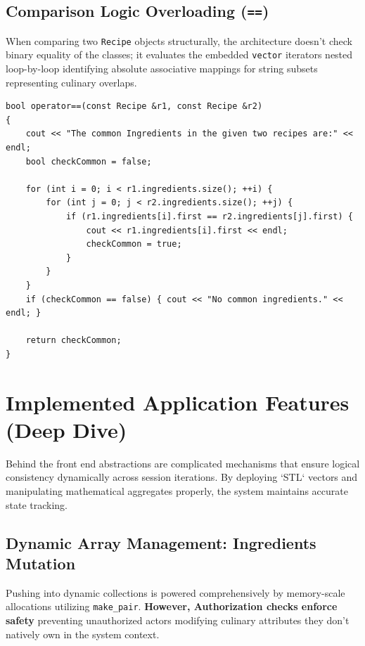 \documentclass[12pt, a4paper]{article}
\begin{document}
\subsection{Comparison Logic Overloading (\texttt{==})}
When comparing two \texttt{Recipe} objects structurally, the architecture doesn't check binary equality of the classes; it evaluates the embedded \texttt{vector} iterators nested loop-by-loop identifying absolute associative mappings for string subsets representing culinary overlaps.

\begin{lstlisting}[caption={Deep Algorithmic Association Overloading (`==`)}]
bool operator==(const Recipe &r1, const Recipe &r2)
{
    cout << "The common Ingredients in the given two recipes are:" << endl;
    bool checkCommon = false;

    for (int i = 0; i < r1.ingredients.size(); ++i) {
        for (int j = 0; j < r2.ingredients.size(); ++j) {
            if (r1.ingredients[i].first == r2.ingredients[j].first) {
                cout << r1.ingredients[i].first << endl; 
                checkCommon = true;
            }
        }
    }
    if (checkCommon == false) { cout << "No common ingredients." << endl; }

    return checkCommon;
}
\end{lstlisting}

\newpage

\section{Implemented Application Features (Deep Dive)}

Behind the front end abstractions are complicated mechanisms that ensure logical consistency dynamically across session iterations. By deploying `STL` vectors and manipulating mathematical aggregates properly, the system maintains accurate state tracking.

\subsection{Dynamic Array Management: Ingredients Mutation}
Pushing into dynamic collections is powered comprehensively by memory-scale allocations utilizing \texttt{make\_pair}. \textbf{However, Authorization checks enforce safety} preventing unauthorized actors modifying culinary attributes they don't natively own in the system context.
\end{document}
